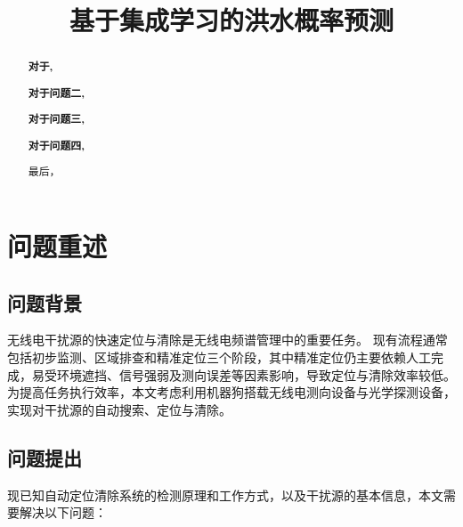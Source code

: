 \documentclass[withoutpreface,bwprint]{cumcmthesis}
\title{基于集成学习的洪水概率预测}  %
\begin{document}
\maketitle
\begin{abstract}


\textbf{对于,}

\textbf{对于问题二,}

\textbf{对于问题三,}

\textbf{对于问题四,}

最后，




\end{abstract}













\vspace{-1.4cm} 
\section{问题重述}
\subsection{问题背景}

无线电干扰源的快速定位与清除是无线电频谱管理中的重要任务。
现有流程通常包括初步监测、区域排查和精准定位三个阶段，其中精准定位仍主要依赖人工完成，易受环境遮挡、信号强弱及测向误差等因素影响，导致定位与清除效率较低。
为提高任务执行效率，本文考虑利用机器狗搭载无线电测向设备与光学探测设备，实现对干扰源的自动搜索、定位与清除。





\subsection{问题提出}
现已知自动定位清除系统的检测原理和工作方式，以及干扰源的基本信息，本文需要解决以下问题：
\end{document}
